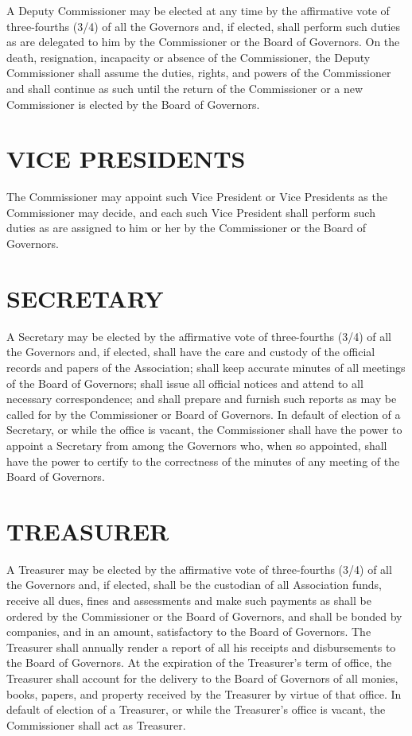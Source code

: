 \documentclass[]{book}
\theoremstyle{definition}
\theoremstyle{definition}
\theoremstyle{definition}
\theoremstyle{remark}
\begin{document}
A Deputy Commissioner may be elected at any time by the affirmative vote
of three-fourths (3/4) of all the Governors and, if elected, shall
perform such duties as are delegated to him by the Commissioner or the
Board of Governors. On the death, resignation, incapacity or absence of
the Commissioner, the Deputy Commissioner shall assume the duties,
rights, and powers of the Commissioner and shall continue as such until
the return of the Commissioner or a new Commissioner is elected by the
Board of Governors.

\section{VICE PRESIDENTS}\label{vice-presidents}

The Commissioner may appoint such Vice President or Vice Presidents as
the Commissioner may decide, and each such Vice President shall perform
such duties as are assigned to him or her by the Commissioner or the
Board of Governors.

\section{SECRETARY}\label{secretary}

A Secretary may be elected by the affirmative vote of three-fourths
(3/4) of all the Governors and, if elected, shall have the care and
custody of the official records and papers of the Association; shall
keep accurate minutes of all meetings of the Board of Governors; shall
issue all official notices and attend to all necessary correspondence;
and shall prepare and furnish such reports as may be called for by the
Commissioner or Board of Governors. In default of election of a
Secretary, or while the office is vacant, the Commissioner shall have
the power to appoint a Secretary from among the Governors who, when so
appointed, shall have the power to certify to the correctness of the
minutes of any meeting of the Board of Governors.

\section{TREASURER}\label{treasurer}

A Treasurer may be elected by the affirmative vote of three-fourths
(3/4) of all the Governors and, if elected, shall be the custodian of
all Association funds, receive all dues, fines and assessments and make
such payments as shall be ordered by the Commissioner or the Board of
Governors, and shall be bonded by companies, and in an amount,
satisfactory to the Board of Governors. The Treasurer shall annually
render a report of all his receipts and disbursements to the Board of
Governors. At the expiration of the Treasurer's term of office, the
Treasurer shall account for the delivery to the Board of Governors of
all monies, books, papers, and property received by the Treasurer by
virtue of that office. In default of election of a Treasurer, or while
the Treasurer's office is vacant, the Commissioner shall act as
Treasurer.
\end{document}
